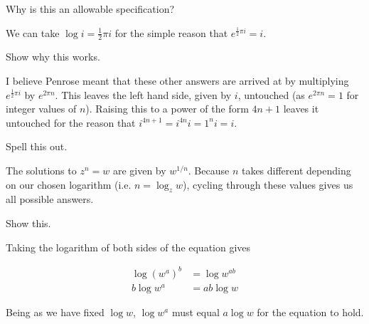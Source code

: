 \documentclass[../the-road-to-reality.tex]{subfiles}
\begin{document}
\begin{questions}
\question Why is this an allowable specification?

\begin{solution}
	We can take $\log{i} = \frac{1}{2}\pi{i}$ for the simple reason that $e^{\frac{1}{2}\pi{i}} = i$.
\end{solution}

\question Show why this works.

\begin{solution}
	I believe Penrose meant that these other answers are arrived at by multiplying $e^{\frac{1}{2}\pi{i}}$ by $e^{2\pi{n}}$. This leaves the left hand side, given by $i$, untouched (as $e^{2\pi{n}} = 1$ for integer values of $n$). Raising this to a power of the form $4n + 1$ leaves it untouched for the reason that $i^{4n + 1} = i^{4n}i = 1^ni = i$.
\end{solution}

\question Spell this out.

\begin{solution}
	The solutions to $z^n = w$ are given by $w^{1/n}$. Because $n$ takes different depending on our chosen logarithm (i.e. $n = \log_zw$), cycling through these values gives us all possible answers.
\end{solution}

\question Show this.

\begin{solution}
	Taking the logarithm of both sides of the equation gives

	\begin{align*}
		\log(w^a)^b &= \log{w^{ab}} \\
		b\log{w^a} &= ab\log{w}
	\end{align*}

	Being as we have fixed $\log{w}$, $\log{w^a}$ must equal $a\log{w}$ for the equation to hold.
\end{solution}

\end{questions}
\end{document}
